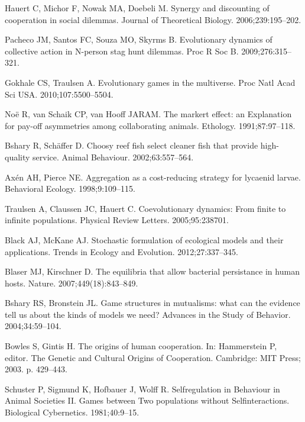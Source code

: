\documentclass[aps,pre,amsfonts,floatfix, onecolumn,showkeys]{revtex4-1}
\begin{document}
\begin{thebibliography}{10}
Hauert C, Michor F, Nowak MA, Doebeli M.
\newblock Synergy and discounting of cooperation in social dilemmas.
\newblock Journal of Theoretical Biology. 2006;239:195--202.

Pacheco JM, Santos FC, Souza MO, Skyrms B.
\newblock Evolutionary dynamics of collective action in N-person stag hunt
  dilemmas.
\newblock Proc R Soc B. 2009;276:315--321.

Gokhale CS, Traulsen A.
\newblock Evolutionary games in the multiverse.
\newblock Proc Natl Acad Sci USA. 2010;107:5500--5504.

No{\"e} R, van Schaik CP, van Hooff JARAM.
\newblock The markert effect: an Explanation for pay-off asymmetries among
  collaborating animals.
\newblock Ethology. 1991;87:97--118.

Bshary R, Sch{\"a}ffer D.
\newblock Choosy reef fish select cleaner fish that provide high-quality
  service.
\newblock Animal Behaviour. 2002;63:557--564.

Ax{\'e}n AH, Pierce NE.
\newblock Aggregation as a cost-reducing strategy for lycaenid larvae.
\newblock Behavioral Ecology. 1998;9:109--115.

Traulsen A, Claussen JC, Hauert C.
\newblock Coevolutionary dynamics: From finite to infinite populations.
\newblock Physical Review Letters. 2005;95:238701.

Black AJ, McKane AJ.
\newblock Stochastic formulation of ecological models and their applications.
\newblock Trends in Ecology and Evolution. 2012;27:337--345.

Blaser MJ, Kirschner D.
\newblock The equilibria that allow bacterial persistance in human hosts.
\newblock Nature. 2007;449(18):843--849.

Bshary RS, Bronstein JL.
\newblock Game structures in mutualisms: what can the evidence tell us about
  the kinds of models we need?
\newblock Advances in the Study of Behavior. 2004;34:59--104.

Bowles S, Gintis H.
\newblock The origins of human cooperation.
\newblock In: Hammerstein P, editor. The Genetic and Cultural Origins of
  Cooperation. Cambridge: MIT Press; 2003. p. 429--443.

Schuster P, Sigmund K, Hofbauer J, Wolff R.
\newblock Selfregulation in Behaviour in Animal Societies II. Games between Two
  populations without Selfinteractions.
\newblock Biological Cybernetics. 1981;40:9--15.


\end{thebibliography}
\end{document}
